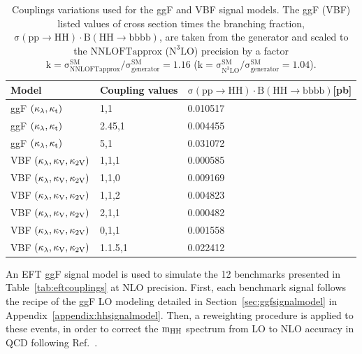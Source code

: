 \begin{table}[htb!]
\caption[Couplings variations used for the ggF and VBF signal models]{Couplings variations used for the ggF and VBF signal models. The ggF (VBF) listed values of cross section times the branching fraction, $\mathrm{\sigma(pp\rightarrow HH) \cdot B(HH\rightarrow bbbb)}$, are taken from the generator and scaled to the $\mathrm{NNLOFTapprox}$ ($\mathrm{N^{3}LO}$) precision by a factor \hbox{$\mathrm{k=\sigma_{NNLOFTapprox}^{SM} / \sigma_{generator}^{SM}=1.16}$} (\hbox{$\mathrm{k=\sigma_{N^{3}LO}^{SM}/\sigma_{generator}^{SM}=1.04}$}). }
\label{tab:hhsignalsamples} 
\centering
\begin{tabularx}{\textwidth}{lXX}
	\hline
    Model                     & Coupling values  & $\mathrm{\sigma(pp\rightarrow HH) \cdot B(HH\rightarrow bbbb)}$[pb]\\
	\hline
ggF $(\kappa_{\lambda},\mathrm{\kappa_{t} })$          & 1,1     & 0.010517 \\	
ggF $(\kappa_{\lambda},\mathrm{\kappa_{t} })$          & 2.45,1  & 0.004455 \\
ggF $(\kappa_{\lambda},\mathrm{\kappa_{t} })$          & 5,1     & 0.031072 \\
VBF $(\kappa_{\lambda},\mathrm{\kappa_{V} },\mathrm{\kappa_{2V} })$     & 1,1,1                  & 0.000585\\	
VBF $(\kappa_{\lambda},\mathrm{\kappa_{V} },\mathrm{\kappa_{2V} })$     & 1,1,0                  & 0.009169\\
VBF $(\kappa_{\lambda},\mathrm{\kappa_{V} },\mathrm{\kappa_{2V} })$     & 1,1,2                  & 0.004823\\
VBF $(\kappa_{\lambda},\mathrm{\kappa_{V} },\mathrm{\kappa_{2V} })$     & 2,1,1                  & 0.000482\\
VBF $(\kappa_{\lambda},\mathrm{\kappa_{V} },\mathrm{\kappa_{2V} })$     & 0,1,1                  & 0.001558\\
VBF $(\kappa_{\lambda},\mathrm{\kappa_{V} },\mathrm{\kappa_{2V} })$     & 1.1.5,1                & 0.022412\\
	\hline
\end{tabularx}

\end{table}

\clearpage
An EFT ggF signal model is used to simulate the 12 benchmarks presented in Table~\ref{tab:eftcouplings} at NLO precision. First,  each benchmark signal follows the recipe of the ggF LO modeling detailed in Section~\ref{sec:ggfsignalmodel} in Appendix~\ref{appendix:hhsignalmodel}. Then, a reweighting procedure is applied to these events, in order to correct the $\mathrm{m_{HH}}$ spectrum from LO to NLO accuracy in QCD following Ref.~\cite{Buchalla:2018yce}. 

